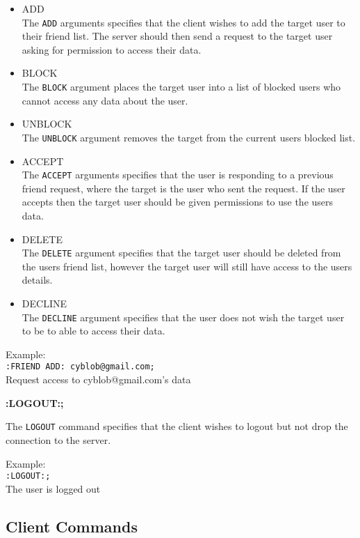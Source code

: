 \begin{itemize}

\item{ADD \\
The \texttt{ADD} arguments specifies that the client wishes to add the target user to their friend list. The server should then send a request to the target user asking for permission to access their data.}

\item{BLOCK \\
The \texttt{BLOCK} argument places the target user into a list of blocked users who cannot access any data about the user.}

\item{UNBLOCK \\
The \texttt{UNBLOCK} argument removes the target from the current users blocked list.}

\item{ACCEPT \\
The \texttt{ACCEPT} arguments specifies that the user is responding to a previous friend request, where the target is the user who sent the request. If the user accepts then the target user should be given permissions to use the users data.}

\item{DELETE \\
The \texttt{DELETE}  argument specifies that the target user should be deleted from the users friend list, however the target user will still have access to the users details.}

\item{DECLINE \\
The \texttt{DECLINE} argument specifies that the user does not wish the target user to be to able to access their data.}

\end{itemize}

Example: \\
\texttt{:FRIEND ADD: cyblob@gmail.com;}	\\
Request access to cyblob@gmail.com’s data

{\bf :LOGOUT:;}

The \texttt{LOGOUT} command specifies that the client wishes to logout but not drop the connection to the server.

Example: \\
\texttt{:LOGOUT:;}\\
The user is logged out

\subsection{Client Commands}

